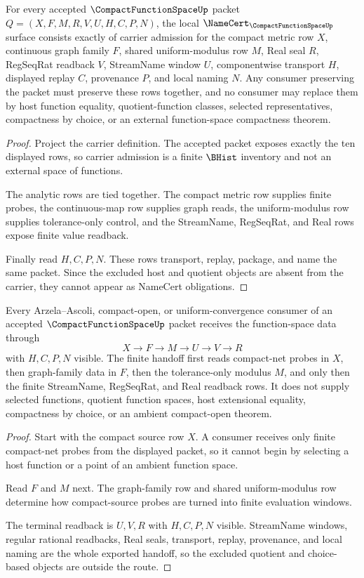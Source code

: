 \begin{theorem}
\label{thm:compact-function-space-namecert-obligations}
For every accepted $\CompactFunctionSpaceUp$ packet $Q=(X,F,M,R,V,U,H,C,P,N)$, the local $\NameCert_{\CompactFunctionSpaceUp}$ surface consists exactly of carrier admission for the compact metric row $X$, continuous graph family $F$, shared uniform-modulus row $M$, Real seal $R$, RegSeqRat readback $V$, StreamName window $U$, componentwise transport $H$, displayed replay $C$, provenance $P$, and local naming $N$. Any consumer preserving the packet must preserve these rows together, and no consumer may replace them by host function equality, quotient-function classes, selected representatives, compactness by choice, or an external function-space compactness theorem.
\end{theorem}
\begin{proof}
Project the carrier definition. The accepted packet exposes exactly the ten displayed rows, so carrier admission is a finite $\BHist$ inventory and not an external space of functions.

The analytic rows are tied together. The compact metric row supplies finite probes, the continuous-map row supplies graph reads, the uniform-modulus row supplies tolerance-only control, and the StreamName, RegSeqRat, and Real rows expose finite value readback.

Finally read $H,C,P,N$. These rows transport, replay, package, and name the same packet. Since the excluded host and quotient objects are absent from the carrier, they cannot appear as NameCert obligations.
\end{proof}

\begin{theorem}
\label{thm:compact-function-space-finite-net-handoff}
Every Arzela--Ascoli, compact-open, or uniform-convergence consumer of an accepted $\CompactFunctionSpaceUp$ packet receives the function-space data through
$$
X \to F \to M \to U \to V \to R
$$
with $H,C,P,N$ visible. The finite handoff first reads compact-net probes in $X$, then graph-family data in $F$, then the tolerance-only modulus $M$, and only then the finite StreamName, RegSeqRat, and Real readback rows. It does not supply selected functions, quotient function spaces, host extensional equality, compactness by choice, or an ambient compact-open theorem.
\end{theorem}
\begin{proof}
Start with the compact source row $X$. A consumer receives only finite compact-net probes from the displayed packet, so it cannot begin by selecting a host function or a point of an ambient function space.

Read $F$ and $M$ next. The graph-family row and shared uniform-modulus row determine how compact-source probes are turned into finite evaluation windows.

The terminal readback is $U,V,R$ with $H,C,P,N$ visible. StreamName windows, regular rational readbacks, Real seals, transport, replay, provenance, and local naming are the whole exported handoff, so the excluded quotient and choice-based objects are outside the route.
\end{proof}

